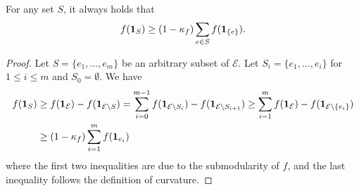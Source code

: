 \setcounter{theorem}{7}
\begin{lemma}		\label{lem:curvature}
For any set $S$, it always holds that
$$
f(\mathbf{1}_{S}) \geq (1-\kappa_{f}) \sum_{e \in S} f(\mathbf{1}_{\{e\}}).
$$
\end{lemma}
\begin{proof}
Let $S = \{e_{1}, \ldots, e_{m}\}$ be an
arbitrary subset of $\mathcal{E}$. Let $S_{i} = \{e_{1}, \ldots, e_{i}\}$ for $1 \leq i \leq m$ and $S_{0} = \emptyset$.
We have
\begin{align*}
f(\mathbf{1}_{S})
&\geq  f(\mathbf{1}_{\mathcal{E}}) -  f(\mathbf{1}_{\mathcal{E} \setminus S})
= \sum_{i=0}^{m-1}  f(\mathbf{1}_{\mathcal{E} \setminus S_{i}}) - f(\mathbf{1}_{\mathcal{E} \setminus S_{i+1}})
\geq \sum_{i=1}^{m}  f(\mathbf{1}_{\mathcal{E}}) - f(\mathbf{1}_{\mathcal{E} \setminus \{e_{i}\}}) \\
&\geq (1 - \kappa_{f}) \sum_{i=1}^{m} f(\mathbf{1}_{e_{i}})
\end{align*}
where the first two inequalities are due to the submodularity of $f$, and the last inequality follows the definition of curvature.
\end{proof}

